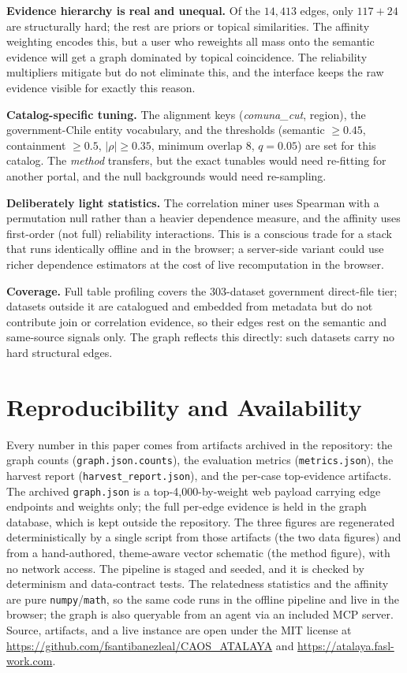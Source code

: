 \documentclass[journal]{IEEEtran}
\newcommand{\dsname}[1]{\textit{#1}}
\begin{document}
\textbf{Evidence hierarchy is real and unequal.} Of the $14{,}413$ edges, only $117+24$ are structurally hard;
the rest are priors or topical similarities. The affinity weighting encodes this, but a user who reweights all
mass onto the semantic evidence will get a graph dominated by topical coincidence. The reliability multipliers
mitigate but do not eliminate this, and the interface keeps the raw evidence visible for exactly this reason.

\textbf{Catalog-specific tuning.} The alignment keys (\dsname{comuna\_cut}, region), the government-Chile entity
vocabulary, and the thresholds (semantic $\ge 0.45$, containment $\ge 0.5$, $|\rho|\ge 0.35$, minimum overlap
$8$, $q=0.05$) are set for this catalog. The \emph{method} transfers, but the exact tunables would need
re-fitting for another portal, and the null backgrounds would need re-sampling.

\textbf{Deliberately light statistics.} The correlation miner uses Spearman with a permutation null rather than a
heavier dependence measure, and the affinity uses first-order (not full) reliability interactions. This is a
conscious trade for a stack that runs identically offline and in the browser; a server-side variant could use
richer dependence estimators at the cost of live recomputation in the browser.

\textbf{Coverage.} Full table profiling covers the $303$-dataset government direct-file tier; datasets outside it
are catalogued and embedded from metadata but do not contribute join or correlation evidence, so their edges rest
on the semantic and same-source signals only. The graph reflects this directly: such datasets carry no hard
structural edges.

\section{Reproducibility and Availability}\label{sec:repro}

Every number in this paper comes from artifacts archived in the repository: the graph counts
(\texttt{graph.json.counts}), the evaluation metrics (\texttt{metrics.json}), the harvest report
(\texttt{harvest\_report.json}), and the per-case top-evidence artifacts. The archived
\texttt{graph.json} is a top-4{,}000-by-weight web payload carrying edge endpoints and weights only;
the full per-edge evidence is held in the graph database, which is kept outside the repository. The three figures
are regenerated deterministically by a single script from those artifacts (the two data figures) and from a
hand-authored, theme-aware vector schematic (the method figure), with no network access. The pipeline is staged
and seeded, and it is checked by determinism and data-contract tests. The relatedness statistics and the affinity
are pure \texttt{numpy}/\texttt{math}, so the same code runs in the offline pipeline and live in the browser; the
graph is also queryable from an agent via an included MCP server. Source, artifacts, and a live instance are open under the MIT
license at \url{https://github.com/fsantibanezleal/CAOS_ATALAYA} and \url{https://atalaya.fasl-work.com}.
\end{document}
